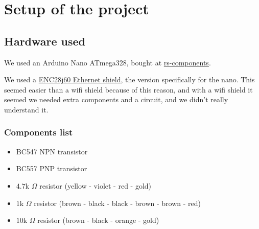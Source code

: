 \documentclass{article}
\begin{document}
	\section{Setup of the project}
	\subsection{Hardware used}
	We used an Arduino Nano ATmega328, bought at \href{http://nl.rs-online.com/}{rs-components}.
	
	We used a \href{http://www.mijn-gadgets.nl/Webwinkel-Product-157562595/ENC28J60-Ethernet-Shield-Network-Module-V1.0-For-Arduino-Nano.html}{ENC28j60 Ethernet shield}, the version specifically for the nano. This seemed easier than a wifi shield because of this reason, and with a wifi shield it seemed we needed extra components and a circuit, and we didn't really understand it.
	
	\subsubsection{Components list}
		\begin{itemize}
			\item BC547 NPN transistor
			\item BC557 PNP transistor
			\item $4.7$k $\Omega$ resistor (yellow - violet - red - gold)
			\item $1$k $\Omega$ resistor (brown - black - black - brown - brown - red)
			\item $10$k $\Omega$ resistor (brown - black - orange - gold)
		\end{itemize}
\end{document}
